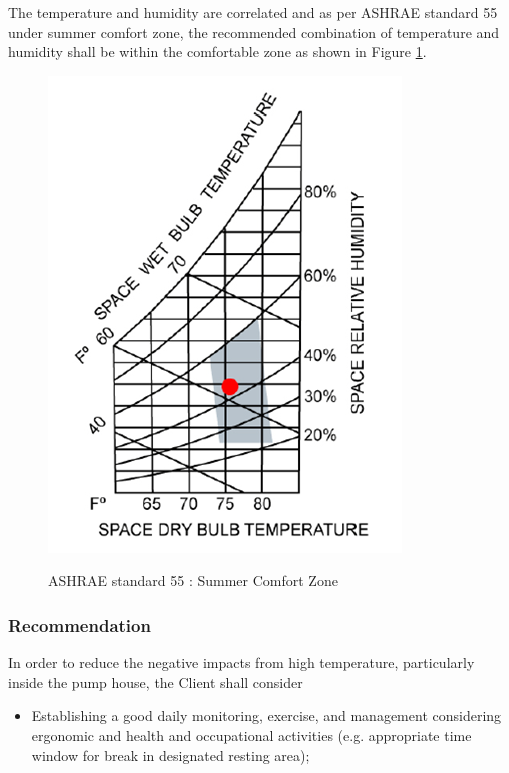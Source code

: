 
The temperature and humidity are correlated and as per ASHRAE standard 55 under summer comfort zone, the recommended combination of temperature and humidity shall be within the comfortable zone as shown in Figure \ref{ch047_ashrae_psychrometrics}.

\begin{figure}[!htb]
	\includegraphics[scale=2]{figures/fig_ch047_ashrae_psychrometrics} \\
	\caption{ASHRAE standard 55 : Summer Comfort Zone}
	\label{ch047_ashrae_psychrometrics} 
\end{figure}

\subsubsection{Recommendation}
In order to reduce the negative impacts from high temperature, particularly inside the pump house, the Client shall consider

\begin{itemize}
	\item Establishing a good daily monitoring, exercise, and management considering ergonomic and health and occupational activities (e.g. appropriate time window for break in designated resting area);

\end{itemize}

